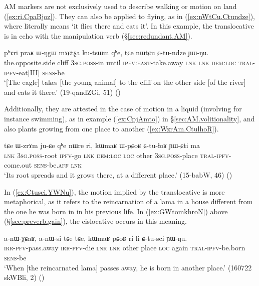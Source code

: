 AM markers are not exclusively used to describe walking or motion on land (\ref{ex:ri.CpaBjoz}). They can also be applied to flying, as in (\ref{ex:nWtCu.Ctundze}), where  literally means `it flies there and eats it'. In this example, the translocative is in echo with the manipulation verb  (§\ref{sec:redundant.AM}).

\begin{exe}
\ex \label{ex:nWtCu.Ctundze}
\gll pʰɤri praʁ ɯ-ŋgɯ mɤɕtʂa ku-tsɯm qʰe, tɕe nɯtɕu ɕ-tu-ndze ɲɯ-ŋu. \\
the.opposite.side cliff \textsc{3sg}.\textsc{poss}-in until  \textsc{ipfv}:\textsc{east}-take.away \textsc{lnk} \textsc{lnk} \textsc{dem}:\textsc{loc} \textsc{tral}-\textsc{ipfv}-eat[III] \textsc{sens}-be \\
\glt `[The eagle] takes [the young animal] to the cliff on the other side [of the river] and eats it there.' (19-qandZGi, 51)
()
\end{exe}

Additionally, they are attested in the case of motion in a liquid (involving for instance swimming), as in example (\ref{ex:CpjAmto}) in §\ref{sec:AM.volitionality}, and also plants growing from one place to another (\ref{ex:WzrAm.CtulhoR}).

\begin{exe}
\ex \label{ex:WzrAm.CtulhoR}
\gll tɕe ɯ-zrɤm ju-ɕe qʰe nɯre ri, kɯmaʁ ɯ-pɕoʁ ɕ-tu-ɬoʁ ɲɯ-ɕti ma   \\
\textsc{lnk} \textsc{3sg}.\textsc{poss}-root \textsc{ipfv}-go \textsc{lnk} \textsc{dem}:\textsc{loc} \textsc{loc} other \textsc{3sg}.\textsc{poss}-place \textsc{tral}-\textsc{ipfv}-come.out \textsc{sens}-be.\textsc{aff} \textsc{lnk} \\
\glt  `Its root spreads and it grows there, at a different place.' (15-babW, 46)
()
\end{exe}

In (\ref{ex:Ctusci.YWNu}), the motion implied by the translocative is more metaphorical, as it refers to the reincarnation of a lama in a house different from the one he was born in in his previous life. In (\ref{ex:GWtomkhroN}) above (§\ref{sec:preverb.gain}), the cislocative occurs in this meaning.


\begin{exe}
\ex \label{ex:Ctusci.YWNu}
\gll a-nɯ-χɕaʁ, a-nɯ-si tɕe tɕe, kɯmaʁ pɕoʁ ri li ɕ-tu-sci ɲɯ-ŋu. \\
\textsc{irr}-\textsc{pfv}-pass.away \textsc{irr}-\textsc{pfv}-die \textsc{lnk} \textsc{lnk} other place \textsc{loc} again \textsc{tral}-\textsc{ipfv}-be.born \textsc{sens}-be \\
\glt `When [the reincarnated lama] passes away, he is born in another place.' (160722 skWBli, 2)
()
\end{exe}

